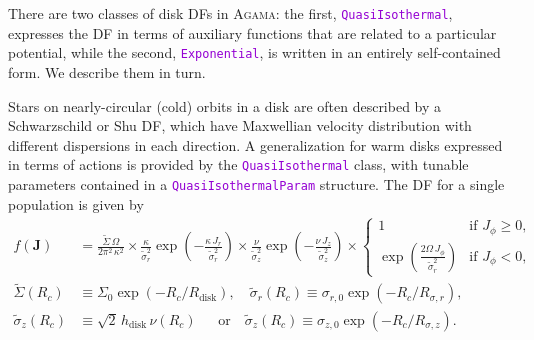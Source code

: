\documentclass[12pt]{article}
\newcommand{\Agama}{\textsc{Agama}\xspace}
\newcommand{\ttt}[1]{\textcolor{darkviolet}{\texttt{#1}}}
\newcommand{\bJ}{\boldsymbol{J}}
\begin{document}
There are two classes of disk DFs in \Agama: the first, \ttt{QuasiIsothermal}, expresses the DF in terms of auxiliary functions that are related to a particular potential, while the second, \ttt{Exponential}, is written in an entirely self-contained form. We describe them in turn.

Stars on nearly-circular (cold) orbits in a disk are often described by a Schwarzschild or Shu DF, which have Maxwellian velocity distribution with different dispersions in each direction. A generalization for warm disks \cite{Dehnen1999} expressed in terms of actions \cite{BinneyMcMillan2011} is provided by the \ttt{QuasiIsothermal} class, with tunable parameters contained in a \ttt{QuasiIsothermalParam} structure. The DF for a single population is given by
\begin{align*}
f(\bJ) &= \frac{\tilde\Sigma\,\Omega}{2\pi^2\,\kappa^2} \times
\frac{\kappa}{\tilde\sigma_r^2} \exp\left(-\frac{\kappa\,J_r}{\tilde\sigma_r^2}\right) \times
\frac{\nu}   {\tilde\sigma_z^2} \exp\left(-\frac{\nu\,   J_z}{\tilde\sigma_z^2}\right) \times
\left\{ \begin{array}{ll}  1 & \mbox{if }J_\phi\ge 0, \\
\exp\left( \frac{2\Omega\,J_\phi}{\tilde\sigma_r^2} \right) & \mbox{if }J_\phi<0, \end{array} \right. \\
\tilde\Sigma(R_c)  &\equiv \Sigma_0 \exp( -R_c / R_\mathrm{disk} ) , \quad
\tilde\sigma_r(R_c) \equiv \sigma_{r,0} \exp( -R_c / R_{\sigma,r} ) ,\\
\tilde\sigma_z(R_c)&\equiv \sqrt{2}\,h_\mathrm{disk}\,\nu(R_c) \quad\;\;\mbox{or}\quad
\tilde\sigma_z(R_c) \equiv \sigma_{z,0} \exp( -R_c / R_{\sigma,z} ) .
\end{align*}
\end{document}
